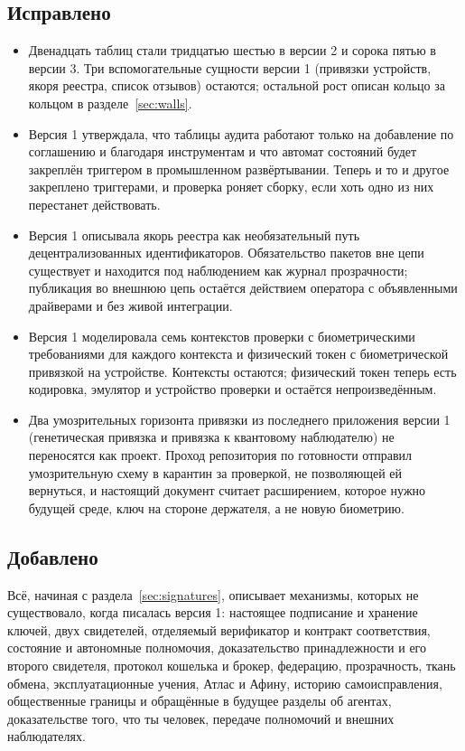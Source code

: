 \subsection*{Исправлено}

\begin{itemize}
  \item Двенадцать таблиц стали тридцатью шестью в версии 2 и сорока пятью в версии 3. Три
    вспомогательные сущности версии 1 (привязки устройств, якоря реестра, список отзывов)
    остаются; остальной рост описан кольцо за кольцом в разделе~\ref{sec:walls}.
  \item Версия 1 утверждала, что таблицы аудита работают только на добавление по соглашению и
    благодаря инструментам и что автомат состояний будет закреплён триггером в промышленном
    развёртывании. Теперь и то и другое закреплено триггерами, и проверка роняет сборку, если хоть
    одно из них перестанет действовать.
  \item Версия 1 описывала якорь реестра как необязательный путь децентрализованных
    идентификаторов. Обязательство пакетов вне цепи существует и находится под наблюдением как
    журнал прозрачности; публикация во внешнюю цепь остаётся действием оператора с объявленными
    драйверами и без живой интеграции.
  \item Версия 1 моделировала семь контекстов проверки с биометрическими требованиями для каждого
    контекста и физический токен с биометрической привязкой на устройстве. Контексты остаются;
    физический токен теперь есть кодировка, эмулятор и устройство проверки и остаётся
    непроизведённым.
  \item Два умозрительных горизонта привязки из последнего приложения версии 1 (генетическая
    привязка и привязка к квантовому наблюдателю) не переносятся как проект. Проход репозитория по
    готовности отправил умозрительную схему в карантин за проверкой, не позволяющей ей вернуться, и
    настоящий документ считает расширением, которое нужно будущей среде, ключ на стороне
    держателя, а не новую биометрию.
\end{itemize}

\subsection*{Добавлено}

Всё, начиная с раздела~\ref{sec:signatures}, описывает механизмы, которых не существовало, когда
писалась версия 1: настоящее подписание и хранение ключей, двух свидетелей, отделяемый верификатор
и контракт соответствия, состояние и автономные полномочия, доказательство принадлежности и его
второго свидетеля, протокол кошелька и брокер, федерацию, прозрачность, ткань обмена,
эксплуатационные учения, Атлас и Афину, историю самоисправления, общественные границы и
обращённые в будущее разделы об агентах, доказательстве того, что ты человек, передаче полномочий
и внешних наблюдателях.
